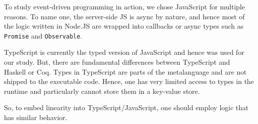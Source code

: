To study event-driven programming in action, we chose JavaScript for multiple reasons. To name one, the server-side JS is async by nature, and hence most of the logic written in Node.JS are wrapped into callbacks or async types such as \texttt{Promise} and \texttt{Observable}.

TypeScript is currently the typed version of JavaScript and hence was used for our study. But, there are fundamental differences between TypeScript and Haskell or Coq. Types in TypeScript are parts of the metalanguage and are not shipped to the executable code. Hence, one has very limited access to types in the runtime and particularly cannot store them in a key-value store.

So, to embed linearity into TypeScript/JavaScript, one should employ logic that has similar behavior.



